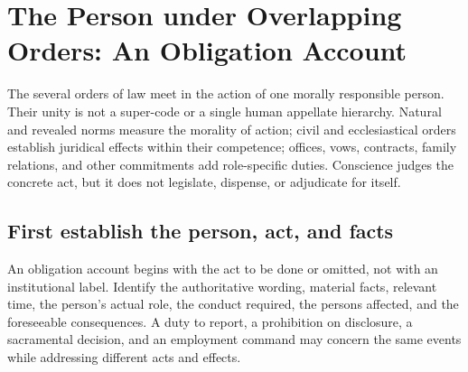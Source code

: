 \section{The Person under Overlapping Orders: An Obligation Account}

The several orders of law meet in the action of one morally responsible person. Their unity is not a super-code or a single human appellate hierarchy. Natural and revealed norms measure the morality of action; civil and ecclesiastical orders establish juridical effects within their competence; offices, vows, contracts, family relations, and other commitments add role-specific duties. Conscience judges the concrete act, but it does not legislate, dispense, or adjudicate for itself.

\subsection{First establish the person, act, and facts}

An obligation account begins with the act to be done or omitted, not with an institutional label. Identify the authoritative wording, material facts, relevant time, the person's actual role, the conduct required, the persons affected, and the foreseeable consequences. A duty to report, a prohibition on disclosure, a sacramental decision, and an employment command may concern the same events while addressing different acts and effects.

